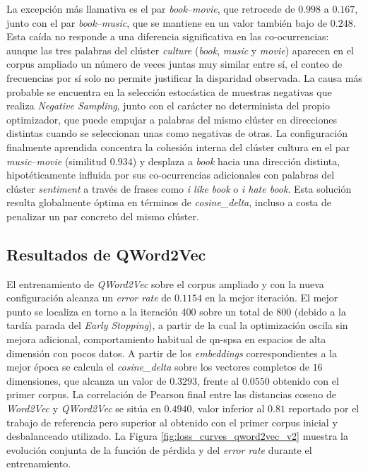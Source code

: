 La excepción más llamativa es el par \textit{book}--\textit{movie}, que retrocede de $0.998$ a $0.167$, junto con el par \textit{book}--\textit{music}, que se mantiene en un valor también bajo de $0.248$. Esta caída no responde a una diferencia significativa en las co-ocurrencias: aunque las tres palabras del clúster \textit{culture} (\textit{book}, \textit{music} y \textit{movie}) aparecen en el corpus ampliado un número de veces juntas muy similar entre sí, el conteo de frecuencias por sí solo no permite justificar la disparidad observada. La causa más probable se encuentra en la selección estocástica de muestras negativas que realiza \textit{Negative Sampling}, junto con el carácter no determinista del propio optimizador, que puede empujar a palabras del mismo clúster en direcciones distintas cuando se seleccionan unas como negativas de otras. La configuración finalmente aprendida concentra la cohesión interna del clúster cultura en el par \textit{music}--\textit{movie} (similitud $0.934$) y desplaza a \textit{book} hacia una dirección distinta, hipotéticamente influida por sus co-ocurrencias adicionales con palabras del clúster \textit{sentiment} a través de frases como \textit{i like book} o \textit{i hate book}. Esta solución resulta globalmente óptima en términos de \textit{cosine\_delta}, incluso a costa de penalizar un par concreto del mismo clúster.

\subsection{Resultados de QWord2Vec}

El entrenamiento de \textit{QWord2Vec} sobre el corpus ampliado y con la nueva configuración alcanza un \textit{error rate} de $0.1154$ en la mejor iteración. El mejor punto se localiza en torno a la iteración 400 sobre un total de 800 (debido a la tardía parada del \textit{Early Stopping}), a partir de la cual la optimización oscila sin mejora adicional, comportamiento habitual de \gls{qn-spsa} en espacios de alta dimensión con pocos datos. A partir de los \textit{embeddings} correspondientes a la mejor época se calcula el \textit{cosine\_delta} sobre los vectores completos de $16$ dimensiones, que alcanza un valor de $0.3293$, frente al $0.0550$ obtenido con el primer corpus. La correlación de Pearson final entre las distancias coseno de \textit{Word2Vec} y \textit{QWord2Vec} se sitúa en $0.4940$, valor inferior al $0.81$ reportado por el trabajo de referencia \cite{ohno_qword2vec_2025} pero superior al obtenido con el primer corpus inicial y desbalanceado utilizado. La Figura \ref{fig:loss_curves_qword2vec_v2} muestra la evolución conjunta de la función de pérdida y del \textit{error rate} durante el entrenamiento.

